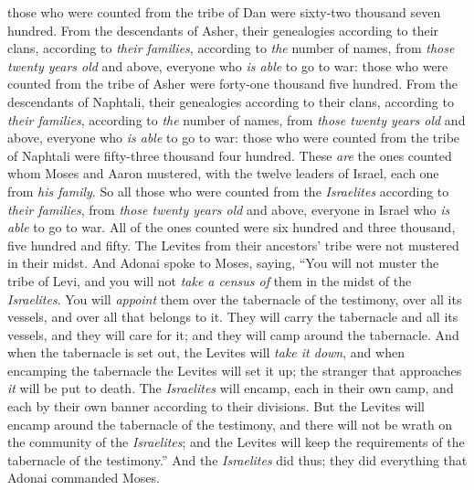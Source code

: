 \begin{biblechapter}
\verse those who were counted from the tribe of Dan were sixty-two thousand seven hundred.
\verse From the descendants of Asher, their genealogies according to their clans, according to \textit{their families}, according to \textit{the} number of names, from \textit{those twenty years old} and above, everyone who \textit{is able} to go to war:
\verse those who were counted from the tribe of Asher were forty-one thousand five hundred.
\verse From the descendants of Naphtali, their genealogies according to their clans, according to \textit{their families}, according to \textit{the} number of names, from \textit{those twenty years old} and above, everyone who \textit{is able} to go to war:
\verse those who were counted from the tribe of Naphtali were fifty-three thousand four hundred.
\verse These \textit{are} the ones counted whom Moses and Aaron mustered, with the twelve leaders of Israel, each one from \textit{his family}.
\verse So all those who were counted from the \textit{Israelites} according to \textit{their families}, from \textit{those twenty years old} and above, everyone in Israel who \textit{is able} to go to war.
\verse All of the ones counted were six hundred and three thousand, five hundred and fifty.
\verse The Levites from their ancestors’ tribe were not mustered in their midst.
\verse And Adonai spoke to Moses, saying,
\verse “You will not muster the tribe of Levi, and you will not \textit{take a census of} them in the midst of the \textit{Israelites}.
\verse You will \textit{appoint} them over the tabernacle of the testimony, over all its vessels, and over all that belongs to it. They will carry the tabernacle and all its vessels, and they will care for it; and they will camp around the tabernacle.
\verse And when the tabernacle is set out, the Levites will \textit{take it down}, and when encamping the tabernacle the Levites will set it up; the stranger that approaches \textit{it} will be put to death.
\verse The \textit{Israelites} will encamp, each in their own camp, and each by their own banner according to their divisions.
\verse But the Levites will encamp around the tabernacle of the testimony, and there will not be wrath on the community of the \textit{Israelites}; and the Levites will keep the requirements of the tabernacle of the testimony.”
\verse And the \textit{Israelites} did thus; they did everything that Adonai commanded Moses.
\end{biblechapter}

